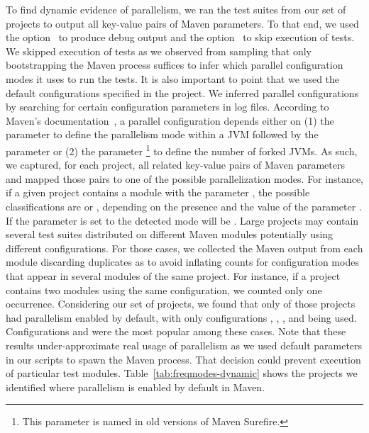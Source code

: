\documentclass[10pt,journal,compsoc]{IEEEtran}
\begin{document}
To find dynamic evidence of parallelism, we ran the test suites from
our set of \numMedLong{} projects to output all key-value pairs of
Maven parameters.  To that end, we used the option~ to
produce debug output and the option~ to skip
execution of tests.  We skipped execution of tests as we observed from
sampling that only bootstrapping the Maven process suffices to infer
which parallel configuration modes it uses to run the
tests.  It is also important to point that we used the default
configurations specified in the project.  We inferred parallel
configurations by searching for certain configuration parameters in
log files. According to Maven's
documentation~\cite{maven-surefire-plugin}, a parallel configuration
depends either on (1) the parameter  to define the
parallelism mode within a JVM followed by the parameter
 or (2) the parameter
\footnote{This parameter is named 
  in old versions of Maven Surefire.} to define the number of forked
JVMs.  As such, we captured, for each project, all related key-value
pairs of Maven parameters and mapped those pairs to one of the
possible parallelization modes.  For instance, if a given project
contains a module with the parameter
, the possible classifications are
\ForkSeq{} or \ForkParMeth{}, depending on the presence and the value
of the parameter .  If the parameter
 is set to  the detected mode will be
\ForkParMeth{}.  Large projects may contain several test suites
distributed on different Maven modules potentially using different
configurations.  For those cases, we collected the Maven output from
each module discarding duplicates as to avoid inflating counts for
configuration modes that appear in several modules of the same
project. For instance, if a project contains two modules using the
same configuration, we counted only one occurrence.
Considering
our set of \numMedLong{} projects, we found that only
\numProjectsPar{} of those projects had parallelism enabled
by default, with only configurations \SeqClassParMeth{}, \ParClassSeqMeth{},
\ParClassParMeth{}, and \ForkSeq{} being used. Configurations
\ParClassParMeth{} and \ForkSeq{} were the most popular among these
cases. Note that these results under-approximate real usage of
parallelism as we used default parameters in our scripts to spawn the
Maven process.  That decision could prevent execution of particular
test modules. Table~\ref{tab:freqmodes-dynamic} shows the
\numProjectsPar{} projects we identified where parallelism is enabled by default in Maven.
\end{document}
